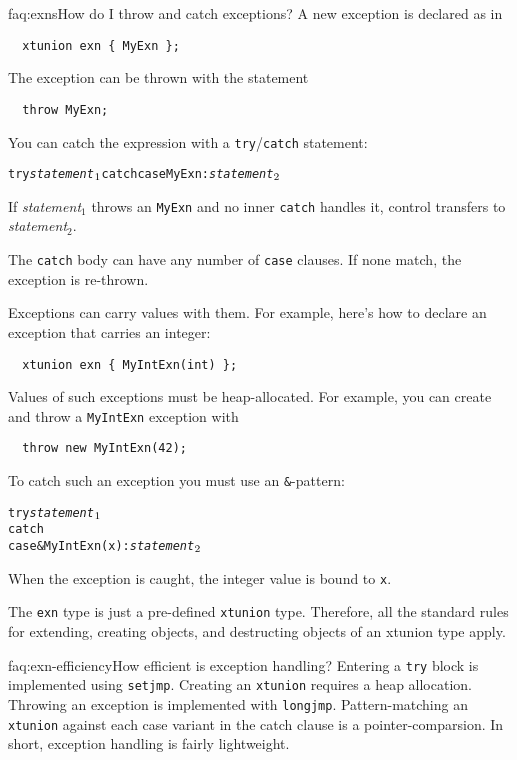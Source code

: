 \begin{faqa}{faq:exns}{How do I throw and catch exceptions?}
A new exception is declared as in 
\begin{verbatim}
  xtunion exn { MyExn };
\end{verbatim}
The exception can be thrown with the statement
\begin{verbatim}
  throw MyExn;
\end{verbatim}
You can catch the expression with a \texttt{try}/\texttt{catch}
statement:
\begin{alltt}
  try {\it statement}\(\sb{1}\) catch \lb case MyExn: {\it statement}\(\sb{2}\) \rb
\end{alltt}
If {\it statement}$_1$ throws an \texttt{MyExn} and no inner
\texttt{catch} handles it, control transfers to 
{\it statement}$_2$.

The \texttt{catch} body can have any number of \texttt{case} clauses.
If none match, the exception is re-thrown.

Exceptions can carry values with them.  For example, here's how to
declare an exception that carries an integer:
\begin{verbatim}
  xtunion exn { MyIntExn(int) };
\end{verbatim}
Values of such exceptions must be heap-allocated.  For example, you
can create and throw a \texttt{MyIntExn} exception with
\begin{verbatim}
  throw new MyIntExn(42);
\end{verbatim}
To catch such an exception you must use an \texttt{\&}-pattern:
\begin{alltt}
  try {\it statement}\(\sb{1}\)
  catch \lb
    case &MyIntExn(x): {\it statement}\(\sb{2}\)
  \rb
\end{alltt}
When the exception is caught, the integer value is bound to \texttt{x}.

The \texttt{exn} type is just a pre-defined \texttt{xtunion} type.
Therefore, all the standard rules for extending, creating objects, and
destructing objects of an xtunion type apply.
\end{faqa}

\begin{faqa}{faq:exn-efficiency}{How efficient is exception handling?}
Entering a \texttt{try} block is implemented using \texttt{setjmp}.
Creating an \texttt{xtunion} requires a heap allocation.  Throwing an
exception is implemented with \texttt{longjmp}.  Pattern-matching an
\texttt{xtunion} against each case variant in the catch clause is a
pointer-comparsion.  In short, exception handling is fairly
lightweight.
\end{faqa}

